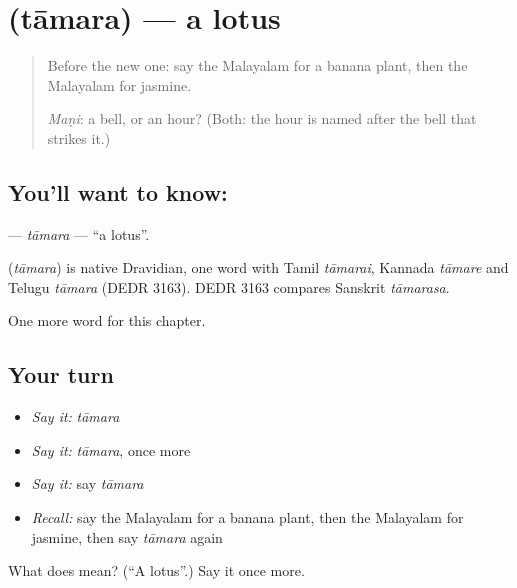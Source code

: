 \section[\texorpdfstring{\ml{താമര} (tāmara)}{താമര (tāmara)}]{ (tāmara) — a lotus}

\label{lesson:ML-C161-tamara}



\begin{quote}
Before the new one: say the Malayalam for a banana plant, then the Malayalam for jasmine.

\emph{Maṇi}: a bell, or an hour? (Both: the hour is named after the bell that strikes it.)
\end{quote}

\subsection*{You'll want to know: }
\textbf{} — \emph{tāmara} — \textquotedblleft{}a lotus\textquotedblright{}.

\begin{cousinweb}
\textbf{} (\emph{tāmara}) is native Dravidian, one word with Tamil \emph{tāmarai}, Kannada \emph{tāmare} and Telugu \emph{tāmara} (DEDR 3163). DEDR 3163 compares Sanskrit \emph{tāmarasa}.
\end{cousinweb}

\begin{grammarlens}[title={What you've built}]
One more word for this chapter.
\end{grammarlens}

\subsection*{Your turn}
\begin{itemize}
\raggedright
  \item \emph{Say it:} \emph{tāmara}
  \item \emph{Say it:} \emph{tāmara}, once more
  \item \emph{Say it:} say \emph{tāmara}
  \item \emph{Recall:} say the Malayalam for a banana plant, then the Malayalam for jasmine, then say \emph{tāmara} again
\end{itemize}

\begin{tcolorbox}[breakable,colback=teal!4,colframe=teal!35!black,title={Before you move on}]
What does  mean? (\textquotedblleft{}A lotus\textquotedblright{}.) Say it once more.
\end{tcolorbox}
